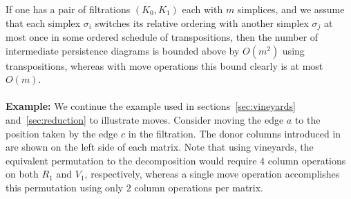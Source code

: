 \documentclass{siamart190516}
\begin{document}
If one has a pair of filtrations $(K_0, K_1)$ each with $m$ simplices, and we assume that each simplex $\sigma_i$ switches its relative ordering with another simplex $\sigma_j$ at most once in some ordered schedule of transpositions, then the number of intermediate persistence diagrams is bounded above by $O(m^2)$ using transpositions, whereas with move operations this bound clearly is at most $O(m)$.  
\\
\\
\noindent \textbf{Example:} We continue the example used in sections~\ref{sec:vineyards} and~\ref{sec:reduction} to illustrate moves. Consider moving the edge $a$ to the position taken by the edge $c$ in the filtration. The donor columns introduced in~\cite{busaryev2010tracking} are shown on the left side of each matrix. Note that using vineyards, the equivalent permutation to the decomposition would require $4$ column operations on both $R_1$ and $V_1$, respectively, whereas a single move operation accomplishes this permutation using only $2$ column operations per matrix. 
\end{document}
